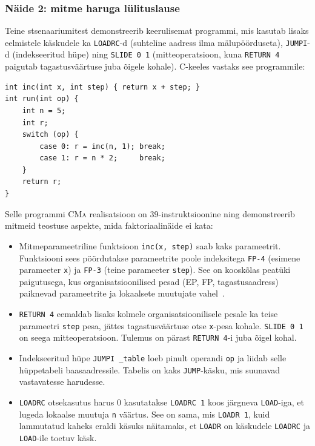 \subsubsection{Näide 2: mitme haruga lülituslause}

Teine stsenaariumitest demonstreerib keerulisemat programmi, mis kasutab lisaks eelmistele käskudele ka \texttt{LOADRC}-d (suhteline aadress ilma mälupöörduseta), \texttt{JUMPI}-d (indekseeritud hüpe) ning \texttt{SLIDE 0 1} (mitteoperatsioon, kuna \texttt{RETURN 4} paigutab tagastusväärtuse juba õigele kohale). C-keeles vastaks see programmile:

\begin{verbatim}
int inc(int x, int step) { return x + step; }
int run(int op) {
    int n = 5;
    int r;
    switch (op) {
        case 0: r = inc(n, 1); break;
        case 1: r = n * 2;     break;
    }
    return r;
}
\end{verbatim}

Selle programmi \textsc{CMa} realisatsioon on 39-instruktsioonine ning demonstreerib mitmeid teostuse aspekte, mida faktoriaalinäide ei kata:

\begin{itemize}
	\item {Mitmeparameetriline funktsioon} \texttt{inc(x, step)} saab kaks parameetrit. Funktsiooni sees pöördutakse parameetrite poole indeksitega \texttt{FP-4} (esimene parameeter \texttt{x}) ja \texttt{FP-3} (teine parameeter \texttt{step}). See on kooskõlas peatüki paigutusega, kus organisatsioonilised pesad (EP, FP, tagastusaadress) paiknevad parameetrite ja lokaalsete muutujate vahel~\cite{wilhelm_imperative_2010}.
	\item \texttt{RETURN 4} eemaldab lisaks kolmele organisatsioonilisele pesale ka teise parameetri \texttt{step} pesa, jättes tagastusväärtuse otse \texttt{x}-pesa kohale. \texttt{SLIDE 0 1} on seega mitteoperatsioon. Tulemus on pärast \texttt{RETURN 4}-i juba õigel kohal.
	\item {Indekseeritud hüpe} \texttt{JUMPI \_table} loeb pinult operandi \texttt{op} ja liidab selle hüppetabeli baasaadressile. Tabelis on kaks \texttt{JUMP}-käsku, mis suunavad vastavatesse harudesse.
	\item {\texttt{LOADRC} otsekasutus} harus 0 kasutatakse \texttt{LOADRC 1} koos järgneva \texttt{LOAD}-iga, et lugeda lokaalse muutuja \texttt{n} väärtus. See on sama, mis \texttt{LOADR 1}, kuid lammutatud kaheks eraldi käsuks näitamaks, et \texttt{LOADR} on käskudele \texttt{LOADRC} ja \texttt{LOAD}-ile toetuv käsk.
\end{itemize}

